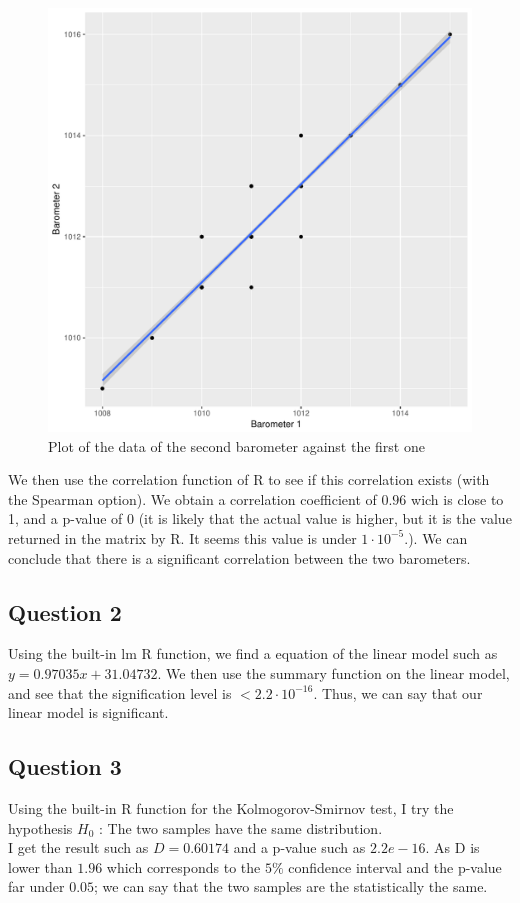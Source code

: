\documentclass[12pt,a4paper]{article}
\begin{document}
\begin{figure}
  \begin{center}
    \includegraphics[width=0.6\linewidth]{corr3.pdf}
    \caption{Plot of the data of the second barometer against the first one}
    \label{corr3}
  \end{center}
\end{figure}

We then use the correlation function of R to see if this correlation exists (with the Spearman option). We obtain a correlation coefficient of $0.96$ wich is close to 1, and a p-value of 0 (it is likely that the actual value is higher, but it is the value returned in the matrix by R. It seems this value is under $1\cdot 10^{-5}$.). We can conclude that there is a significant correlation between the two barometers.

\subsection*{Question 2}
Using the built-in lm R function, we find a equation of the linear model such as $y = 0.97035x + 31.04732$. We then use the summary function on the linear model, and see that the signification level is $<2.2 \cdot 10^{-16}$. Thus, we can say that our linear model is significant.

\subsection*{Question 3}
Using the built-in R function for the Kolmogorov-Smirnov test, I try the hypothesis $H_0$ : The two samples have the same distribution.\\
I get the result such as $D = 0.60174$ and a p-value such as $2.2e-16$. As D is lower than $1.96$ which corresponds to the $5\%$ confidence interval and the p-value far under $0.05$; we can say that the two samples are the statistically the same.\\
\end{document}
